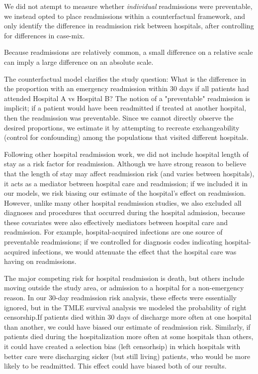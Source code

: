 \documentclass[]{article}\usepackage[]{graphicx}\usepackage[]{color}
\begin{document}
We did not atempt to measure whether \emph{individual} readmissions were preventable, we instead opted to place readmissions within a counterfactual framework, and only identify the difference in readmission risk between hospitals, after controlling for differences in case-mix. 

Because readmissions are relatively common, a small difference on a relative scale can imply a large difference on an absolute scale.


The counterfactual model clarifies the study question: What is the difference in the proportion with an emergency readmission within 30 days if all patients had attended Hospital A vs Hospital B? The notion of a "preventable" readmission is implicit; if a patient would have been readmitted if treated at another hospital, then the readmission was preventable. Since we cannot directly observe the desired proportions, we estimate it by attempting to recreate exchangeability (control for confounding) among the populations that visited different hospitals.

Following other hospital readmission work, we did not include hospital length of stay as a risk factor for readmission. Although we have strong reason to believe that the length of stay may affect readmission risk (and varies between hospitals), it acts as a mediator between hospital care and readmission; if we included it in our models, we risk biasing our estimate of the hospital's effect on readmission. However, unlike many other hospital readmission studies, we also excluded all diagnoses and procedures that occurred during the hospital admission, because these covariates were also effectively mediators between hospital care and readmission. For example, hospital-acquired infections are one source of preventable readmissions; if we controlled for diagnosis codes indicating hospital-acquired infections, we would attenuate the effect that the hospital care was having on readmissions.

The major competing risk for hospital readmission is death, but others include moving outside the study area, or admission to a hospital for a non-emergency reason. In our 30-day readmission risk analysis, these effects were essentially ignored, but in the TMLE survival analysis we modeled the probability of right censorship.If patients died within 30 days of discharge more often at one hospital than another, we could have biased our estimate of readmission risk. Similarly, if patients died during the hospitalization more often at some hospitals than others, it could have created a selection bias (left censorhsip) in which hospitals with better care were discharging sicker (but still living) patients, who would be more likely to be readmitted. This effect could have biased both of our results.
\end{document}
